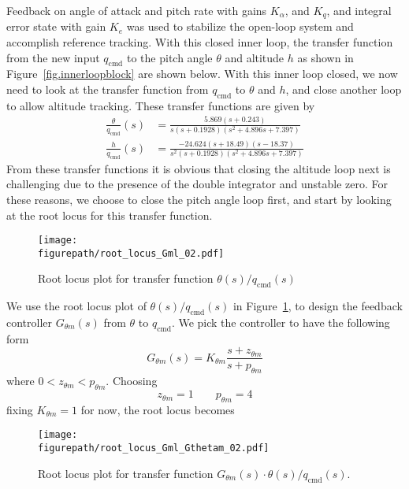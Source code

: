 \documentclass[]{../sty/aiaa-tc}
\newcommand{\figurepath}{../fig}
\theoremstyle{examplestyle}
\begin{document}
  Feedback on angle of attack and pitch rate with gains $K_{\alpha}$, and $K_{q}$, and integral error state with gain $K_{e}$ was used to stabilize the open-loop system and accomplish reference tracking.
  With this closed inner loop, the transfer function from the new input $q_{\text{cmd}}$ to the pitch angle $\theta$ and altitude $h$ as shown in Figure~\ref{fig.innerloopblock} are shown below.
  With this inner loop closed, we now need to look at the transfer function from $q_{\text{cmd}}$ to $\theta$ and $h$, and close another loop to allow altitude tracking.
  These transfer functions are given by
  \begin{equation*}
    \begin{split}
      \frac{\theta}{q_{\text{cmd}}}(s)&=\frac{5.869 (s+0.243)}{s (s+0.1928) (s^{2} + 4.896s + 7.397)} \\
      \frac{h}{q_{\text{cmd}}}(s)&=\frac{-24.624 (s+18.49) (s-18.37)}{s^2 (s+0.1928) (s^{2} + 4.896s + 7.397)}
    \end{split}
  \end{equation*}
  From these transfer functions it is obvious that closing the altitude loop next is challenging due to the presence of the double integrator and unstable zero.
  For these reasons, we choose to close the pitch angle loop first, and start by looking at the root locus for this transfer function.
  \begin{figure}[H]
    \begin{center}
      \texttt{[image: \\figurepath/root\_locus\_Gml\_02.pdf]}
      \vspace{-0.1in}
      \caption{Root locus plot for transfer function $\theta(s)/q_{\text{cmd}}(s)$\label{fig.rl_qcmd_theta}}
    \end{center}
  \end{figure}
  We use the root locus plot of $\theta(s)/q_{\text{cmd}}(s)$ in Figure~\ref{fig.rl_qcmd_theta}, to design the feedback controller $G_{\theta m}(s)$ from $\theta$ to $q_{\text{cmd}}$.
  We pick the controller to have the following form
  \begin{equation}
    \label{eqn.Gthetam}
    G_{\theta m}(s)=K_{\theta m}\frac{s+z_{\theta m}}{s+p_{\theta m}}
  \end{equation}
  where $0<z_{\theta m}<p_{\theta m}$.
  Choosing
  \begin{equation*}
    z_{\theta m} = 1
    \qquad
    p_{\theta m} = 4
  \end{equation*}
  fixing $K_{\theta m}=1$ for now, the root locus becomes
  \begin{figure}[H]
    \begin{center}
      \texttt{[image: \\figurepath/root\_locus\_Gml\_Gthetam\_02.pdf]}
      \vspace{-0.1in}
      \caption{Root locus plot for transfer function $G_{\theta m}(s)\cdot \theta(s)/q_{\text{cmd}}(s)$.\label{fig.rootlocus_Gml}}
    \end{center}
  \end{figure}
\end{document}
